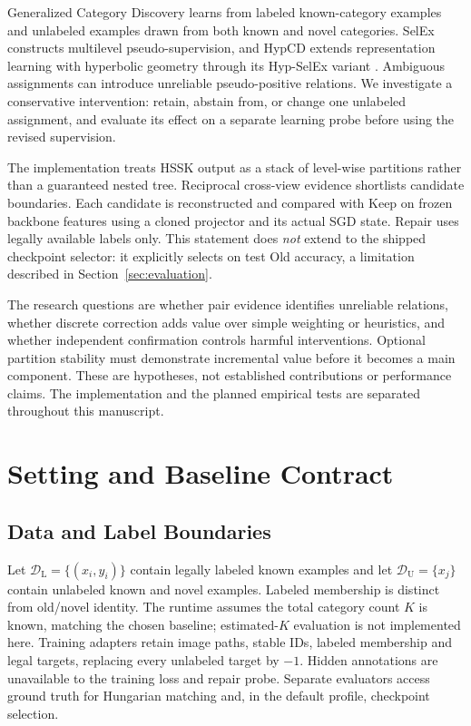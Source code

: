 \documentclass[conference]{IEEEtran}
\newcommand{\Dl}{\mathcal D_{\mathrm L}}
\newcommand{\Du}{\mathcal D_{\mathrm U}}
\begin{document}
Generalized Category Discovery learns from labeled known-category examples and unlabeled examples drawn from both known and novel categories. SelEx constructs multilevel pseudo-supervision, and HypCD extends representation learning with hyperbolic geometry through its Hyp-SelEx variant \cite{selex,hypcd}. Ambiguous assignments can introduce unreliable pseudo-positive relations. We investigate a conservative intervention: retain, abstain from, or change one unlabeled assignment, and evaluate its effect on a separate learning probe before using the revised supervision.

The implementation treats HSSK output as a stack of level-wise partitions rather than a guaranteed nested tree. Reciprocal cross-view evidence shortlists candidate boundaries. Each candidate is reconstructed and compared with Keep on frozen backbone features using a cloned projector and its actual SGD state. Repair uses legally available labels only. This statement does \emph{not} extend to the shipped checkpoint selector: it explicitly selects on test Old accuracy, a limitation described in Section~\ref{sec:evaluation}.

The research questions are whether pair evidence identifies unreliable relations, whether discrete correction adds value over simple weighting or heuristics, and whether independent confirmation controls harmful interventions. Optional partition stability must demonstrate incremental value before it becomes a main component. These are hypotheses, not established contributions or performance claims. The implementation and the planned empirical tests are separated throughout this manuscript.

\section{Setting and Baseline Contract}
\subsection{Data and Label Boundaries}
Let $\Dl=\{(x_i,y_i)\}$ contain legally labeled known examples and let $\Du=\{x_j\}$ contain unlabeled known and novel examples. Labeled membership is distinct from old/novel identity. The runtime assumes the total category count $K$ is known, matching the chosen baseline; estimated-$K$ evaluation is not implemented here. Training adapters retain image paths, stable IDs, labeled membership and legal targets, replacing every unlabeled target by $-1$. Hidden annotations are unavailable to the training loss and repair probe. Separate evaluators access ground truth for Hungarian matching and, in the default profile, checkpoint selection.
\end{document}
